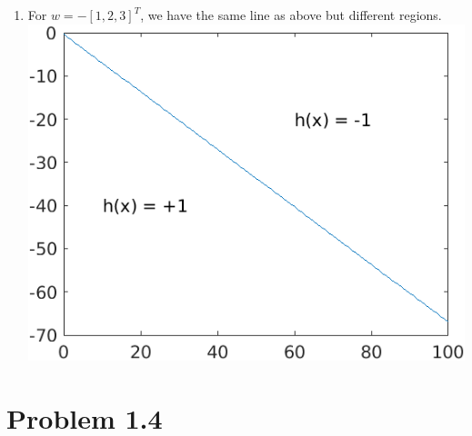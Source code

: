\documentclass{article}
\def\math#1{$#1$}
\begin{document}
\begin{enumerate}[a)]
\begin{enumerate}[1)]
            \item For \math{w = - [1,2,3]^T}, we have the same line as above but different regions. \\
            \includegraphics{1.2/2}
        \end{enumerate}
\end{enumerate}

\section{Problem 1.4}
\end{document}
